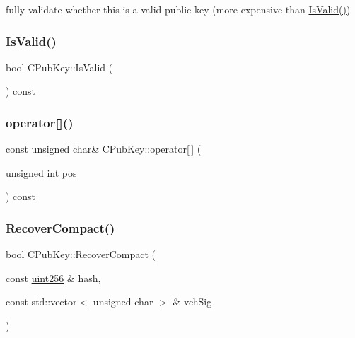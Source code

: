 fully validate whether this is a valid public key (more expensive than \mbox{\hyperlink{class_c_pub_key_a4fa94293cf8577fd039b9a133f6c7f30}{Is\+Valid()}}) 

\mbox{\label{class_c_pub_key_a4fa94293cf8577fd039b9a133f6c7f30}} 
\subsubsection{\texorpdfstring{Is\+Valid()}{IsValid()}}
{\footnotesize\ttfamily bool C\+Pub\+Key\+::\+Is\+Valid (\begin{DoxyParamCaption}{ }\end{DoxyParamCaption}) const\hspace{0.3cm}{\ttfamily [inline]}}

\mbox{\label{class_c_pub_key_ab94321a511874f4a3cdf21f889d30144}} 
\subsubsection{\texorpdfstring{operator[]()}{operator[]()}}
{\footnotesize\ttfamily const unsigned char\& C\+Pub\+Key\+::operator\mbox{[}$\,$\mbox{]} (\begin{DoxyParamCaption}\item[{unsigned int}]{pos }\end{DoxyParamCaption}) const\hspace{0.3cm}{\ttfamily [inline]}}

\mbox{\label{class_c_pub_key_a169505e735a02db385486b0affeb565c}} 
\subsubsection{\texorpdfstring{Recover\+Compact()}{RecoverCompact()}}
{\footnotesize\ttfamily bool C\+Pub\+Key\+::\+Recover\+Compact (\begin{DoxyParamCaption}\item[{const \mbox{\hyperlink{classuint256}{uint256}} \&}]{hash,  }\item[{const std\+::vector$<$ unsigned char $>$ \&}]{vch\+Sig }\end{DoxyParamCaption})}



